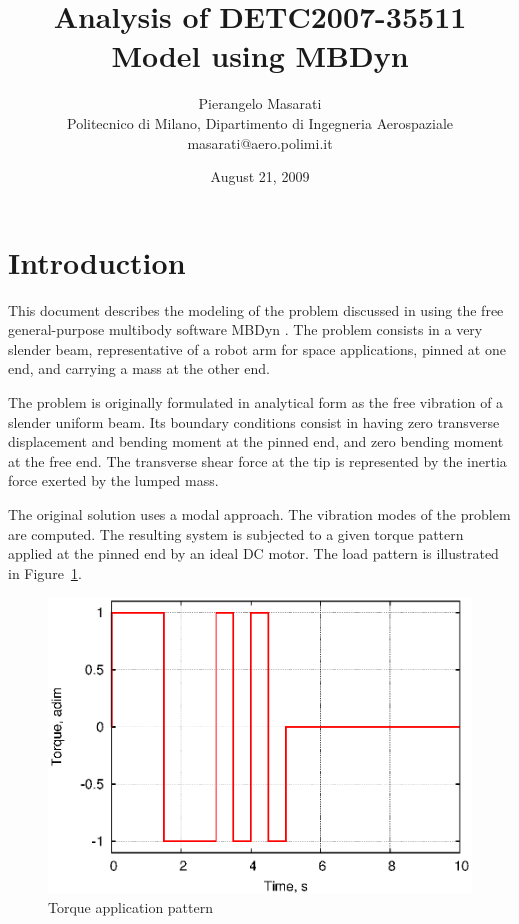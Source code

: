 \documentclass[11pt, a4paper, subeqn]{article}
\begin{document}
\title{Analysis of DETC2007-35511 Model using MBDyn}

\author{Pierangelo Masarati \\
Politecnico di Milano, Dipartimento di Ingegneria Aerospaziale \\
masarati@aero.polimi.it}

\date{August 21, 2009}

\maketitle

\section*{Introduction}
This document describes the modeling of the problem
discussed in \cite{MACLEAN-2007} using the free general-purpose
multibody software MBDyn \cite{MBDYN-WWW}.
The problem consists in a very slender beam, representative of a robot arm
for space applications, pinned at one end, and carrying a mass
at the other end.

The problem is originally formulated in analytical form as the free vibration
of a slender uniform beam.
Its boundary conditions consist in having zero transverse displacement
and bending moment at the pinned end, and zero bending moment at the free end.
The transverse shear force at the tip is represented by the inertia force
exerted by the lumped mass.

The original solution uses a modal approach.
The vibration modes of the problem are computed.
The resulting system is subjected to a given torque pattern applied
at the pinned end by an ideal DC motor.
The load pattern is illustrated in Figure~\ref{fig:torque-1}.

\begin{figure}
\centering
\includegraphics[width=.8\textwidth]{torque-1.eps}
\caption{Torque application pattern}
\label{fig:torque-1}
\end{figure}
\end{document}

